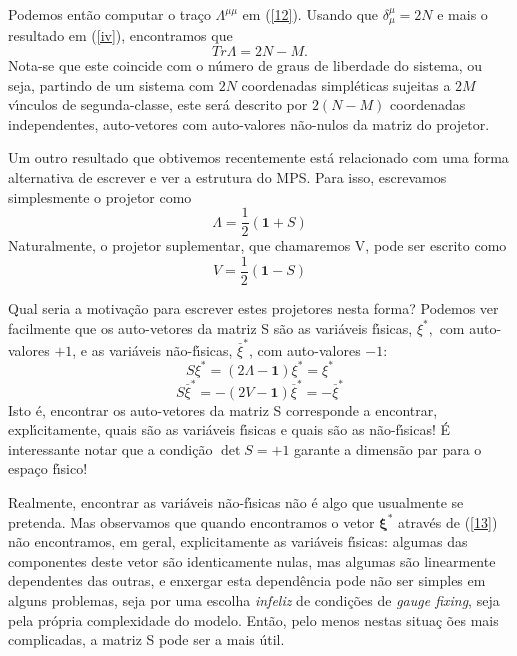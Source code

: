 \documentclass[a4paper,thmsa,12pt]{report}
\begin{document}
Podemos ent\~{a}o computar o tra\c{c}o $\Lambda ^{\mu \mu }$ em (\ref{12}).
Usando que $\delta _{\mu }^{\mu }=2N$ e mais o resultado em (\ref{iv}),
encontramos que 
\begin{equation}
Tr\Lambda =2N-M.  \label{v}
\end{equation}
Nota-se que este coincide com o n\'{u}mero de graus de liberdade do sistema,
ou seja, partindo de um sistema com $2N$ coordenadas simpl\'{e}ticas sujeitas
a $2M$ v\'{\i}nculos de segunda-classe, este ser\'{a} descrito por $2(N-M)$
coordenadas independentes, auto-vetores com auto-valores n\~{a}o-nulos da
matriz do projetor.

Um outro resultado que obtivemos recentemente est\'{a} relacionado com uma
forma alternativa de escrever e ver a estrutura do MPS. Para isso,
escrevamos simplesmente o projetor como 
\begin{equation}
\Lambda =\frac{1}{2}\left( \mathbf{1}+S\right)  \label{vi}
\end{equation}
Naturalmente, o projetor suplementar, que chamaremos V, pode ser escrito
como 
\begin{equation}
V=\frac{1}{2}\left( \mathbf{1}-S\right)  \label{vii}
\end{equation}

Qual seria a motiva\c{c}\~{a}o para escrever estes projetores nesta forma?
Podemos ver facilmente que os auto-vetores da matriz S s\~{a}o as
vari\'{a}veis f\'{\i}sicas, $\xi ^{*},$ com auto-valores $+1$, e as
vari\'{a}veis n\~{a}o-f\'{\i}sicas, $\stackrel{\_}{\xi }^{*}$, com
auto-valores $-1$: 
\begin{equation}
S\xi ^{*}=\left( 2\Lambda -\mathbf{1}\right) \xi ^{*}=\xi ^{*}  \label{viii}
\end{equation}
\begin{equation}
S\stackrel{\_}{\xi }^{*}=-\left( 2V-\mathbf{1}\right) \stackrel{\_}{\xi }%
^{*}=-\stackrel{\_}{\xi }^{*}  \label{ix}
\end{equation}
Isto \'{e}, encontrar os
auto-vetores da matriz S corresponde a encontrar, expl\'{\i}citamente, quais
s\~{a}o as vari\'{a}veis f\'{\i}sicas e quais s\~{a}o as
n\~{a}o-f\'{\i}sicas! \'{E} interessante notar que a condi\c{c}\~{a}o $\det S=+1$ garante a
dimens\~{a}o par para o espa\c{c}o f\'{\i}sico! 

Realmente, encontrar as vari\'{a}veis n\~{a}o-f\'{\i}sicas n\~{a}o \'{e}
algo que usualmente se pretenda. Mas observamos que quando encontramos o
vetor $\mathbf{\xi }^{\ast }$ atrav\'{e}s de (\ref{13}) n\~{a}o encontramos,
em geral, explicitamente as vari\'{a}veis f\'{\i}sicas: algumas das
componentes deste vetor s\~{a}o identicamente nulas, mas algumas s\~{a}o
linearmente dependentes das outras, e enxergar esta depend\^{e}ncia pode
n\~{a}o ser simples em alguns problemas, seja por uma escolha \textit{%
infeliz }de condi\c{c}\~{o}es de \textit{gauge fixing}, seja pela
pr\'{o}pria complexidade do modelo. Ent\~{a}o, pelo menos nestas situa\c{c}%
\~{o}es mais complicadas, a matriz S pode ser a mais \'{u}til.
\end{document}
